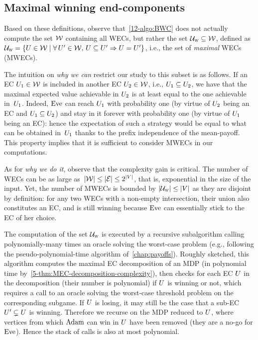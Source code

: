 \subsection*{Maximal winning end-components} Based on these definitions, observe that~\cref{12-algo:BWC} does not actually compute the set $\mathcal{W}$ containing all WECs, but rather the set $\mathcal{U}_{\textsc{w}} \subseteq \mathcal{W}$, defined as $\mathcal{U}_{\textsc{w}} = \{U \in \mathcal{W} \mid \forall\, U' \in \mathcal{W},\, U \subseteq U' \Rightarrow U = U'\}$, i.e., the set of \textit{maximal} WECs (MWECs).

The intuition on \textit{why we can} restrict our study to this subset is as follows. If an EC $U_{1} \in \mathcal{W}$ is included in another EC $U_{2} \in \mathcal{W}$, i.e., $U_{1} \subseteq U_{2}$, we have that the maximal expected value achievable in $U_{2}$ is at least equal to the one achievable in~$U_{1}$. Indeed, $\text{Eve}$ can reach $U_{1}$ with probability one (by virtue of $U_{2}$ being an EC and $U_{1} \subseteq U_{2}$) and stay in it forever with probability one (by virtue of $U_{1}$ being an EC): hence the expectation of such a strategy would be equal to what can be obtained in~$U_{1}$ thanks to the prefix independence of the mean-payoff. This property implies that it is sufficient to consider MWECs in our computations.

As for \textit{why we do it}, observe that the complexity gain is critical. The number of WECs can be as large as~$\vert\mathcal{W}\vert \leq \vert\mathcal{E}\vert \leq 2^{\vert V\vert}$, that is, exponential in the size of the input. Yet, the number of MWECs is bounded by $\vert\mathcal{U}_{\textsc{w}}\vert \leq \vert V\vert$ as they are disjoint by definition: for any two WECs with a non-empty intersection, their union also constitutes an EC, and is still winning because $\text{Eve}$ can essentially stick to the EC of her choice.

The computation of the set $\mathcal{U}_{\textsc{w}}$ is executed by a recursive subalgorithm calling polynomially-many times an oracle solving the worst-case problem (e.g., following the pseudo-polynomial-time algorithm of~\cref{chap:payoffs}).  Roughly sketched, this algorithm computes the maximal EC decomposition of an MDP (in polynomial time by~\cref{5-thm:MEC-decomposition-complexity}), then checks for each EC $U$ in the decomposition (their number is polynomial) if $U$ is winning or not, which requires a call to an oracle solving the worst-case threshold problem on the corresponding subgame. If $U$ is losing, it may still be the case that a sub-EC $U' \subsetneq U$ is winning. Therefore we recurse on the MDP reduced to $U$, where vertices from which $\text{Adam}$ can win in $U$ have been removed (they are a no-go for $\text{Eve}$). Hence the stack of calls is also at most polynomial.

